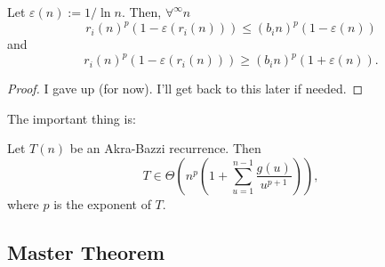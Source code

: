 \begin{lemma}
    Let $\varepsilon(n) := 1 / \ln n$.
    Then, $\forall^{\infty} n$ \[
    r_i(n)^{p}\left( 1 - \varepsilon(r_i(n)) \right)  \le  (b_i n)^{p}(1 - \varepsilon(n))
    \] and \[
    r_i(n)^{p}\left( 1 - \varepsilon(r_i(n)) \right)  \ge   (b_i n)^{p}(1 + \varepsilon(n))
    .\] 
\end{lemma}
\begin{proof}
    I gave up (for now). I'll get back to this later if needed.
\end{proof}

The important thing is:
\begin{theorem}
    Let $T(n)$ be an Akra-Bazzi recurrence.
    Then \[
    T \in \Theta\left( n^{p}\left( 1 + \sum_{u=1}^{n-1} \frac{g(u)}{u^{p+1}} \right)  \right) 
    ,\] where $p$ is the exponent of $T$.
\end{theorem}

\subsection*{Master Theorem}

